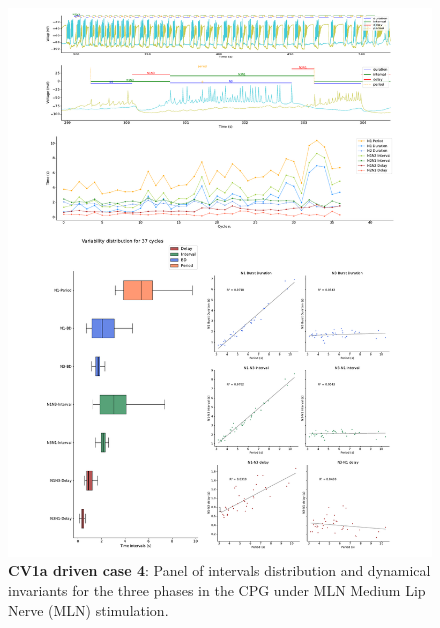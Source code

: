 \begin{figure}[htbp]
	\centering
	\includegraphics[width=1.1\textwidth]{./invariants/data/SUSSEX/MLN_driven/images/panel_with_intervals.pdf}
	\caption{\textbf{CV1a driven case 4}: Panel of intervals distribution and dynamical invariants for the three phases in the CPG under MLN Medium Lip Nerve (MLN) stimulation.}
	\label{fig:mln stimulation}
\end{figure}


